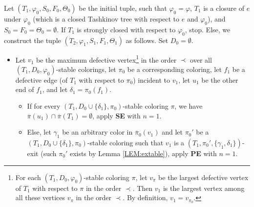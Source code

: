 \documentclass[11pt]{article}
\newcommand{\phiv}{\varphi}
\begin{document}
 Let $(T_1, \phiv_0, S_0, F_0, \Theta_0)$ be the initial tuple, such that $\varphi_0=\varphi$, $T_1$ is a closure of $e$ under 
$\varphi_0$ (which is a closed Tashkinov tree with respect to $e$ and $\varphi_0$), and $S_0 = F_0 = \Theta_0=\emptyset$.  
\vskip 2mm
If $T_1$ is strongly closed with respect to $\phiv_{0}$, stop. Else, we construct the tuple $(T_2, \phiv_1, S_1, F_1, \Theta_1)$ as follows. 
Set $D_{0}=\emptyset$.
\begin{itemize}
\vspace{-2mm}	
\item Let $v_1$ be the maximum defective vertex\footnote{For each  $(T_1, D_{0}, \phiv_{0})$-stable coloring $\pi$, let $v_{\pi}$ be the 
largest defective vertex of $T_1$ with respect to $\pi$ in the order $\prec$. Then $v_1$ is the largest vertex among all these vertices 
$v_{\pi}$ in the order $\prec$. By definition, $v_1=v_{\pi_0}$. } in the order $\prec$ over all $(T_1, D_{0}, \phiv_{0})$-stable colorings, let 
$\pi_{0}$ be a corresponding coloring, let $f_1$ be a defective edge (of $T_1$ with respect to $\pi_0$) incident to $v_1$, let $u_1$ be 
the other end of $f_1$, and let $\delta_1=\pi_{0}(f_1)$. 
	\begin{itemize}
	\vspace{-2mm}	
		\item If for every $(T_1, D_{0}\cup\{\delta_1\}, \pi_{0})$-stable coloring $\pi$,  we have $\overline{\pi}(u_1) \cap \overline{\pi} (T_1)=\emptyset$, apply {\bf SE} with $n=1$.
		\item Else, let $\gamma_1$ be an arbitrary color in $\overline{\pi}_0(v_1)$ and let $\pi_{0}'$ be a $(T_1, D_{0}\cup\{\delta_1\}, 
		\pi_{0})$-stable coloring such that $v_1$ is a $(T_1, \pi_{0}', \{\gamma_1, \delta_1\})$-exit (such $\pi_{0}'$ exists by   
		Lemma \ref{LEM:extable}), apply {\bf PE} with $n=1$.
	\end{itemize}
\end{itemize}

\vspace{-1mm}
\end{document}
